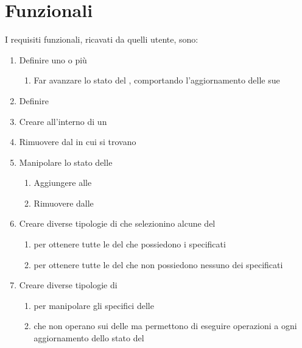 \section{Funzionali}\label{sec:funzionali}
I requisiti funzionali, ricavati da quelli utente, sono:
\begin{enumerate}[label=\textbf{\ref{sec:funzionali}.\arabic*}]
    \item \label{itm:f1} Definire uno o più \World
    \begin{enumerate}[label=\textbf{\ref{itm:f1}.\arabic*}]
        \item \label{itm:ff2} Far avanzare lo stato del \World, comportando l'aggiornamento delle sue \Entity
    \end{enumerate}
    \item \label{itm:f2} Definire \Component
    \item \label{itm:f3} Creare \Entity all'interno di un \World
    \item \label{itm:f4} Rimuovere \Entity dal \World in cui si trovano
    \item \label{itm:f5} Manipolare lo stato delle \Entity
    \begin{enumerate}[label=\textbf{\ref{itm:f5}.\arabic*}]
        \item \label{itm:ff3} Aggiungere \Component alle \Entity
        \item \label{itm:ff4} Rimuovere \Component dalle \Entity
    \end{enumerate}
    \item \label{itm:f6} Creare diverse tipologie di \View che selezionino alcune \Entity del \World
    \begin{enumerate}[label=\textbf{\ref{itm:f6}.\arabic*}]
        \item \label{itm:ff5} \View per ottenere tutte le \Entity del \World che possiedono i \Component specificati
        \item \label{itm:ff6} \View per ottenere tutte le \Entity del \World che non possiedono nessuno dei \Component specificati
    \end{enumerate}
    \item \label{itm:f7} Creare diverse tipologie di \System
    \begin{enumerate}[label=\textbf{\ref{itm:f7}.\arabic*}]
        \item \label{itm:ff7} \System per manipolare gli specifici \Component delle \Entity
        \item \label{itm:ff10} \System che non operano sui \Component delle \Entity ma permettono di eseguire operazioni a ogni aggiornamento dello stato del \World

\end{enumerate}
\end{enumerate}
